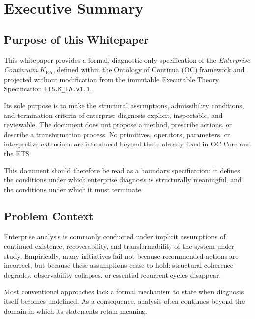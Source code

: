 
\section{Executive Summary}

\subsection*{Purpose of this Whitepaper}

This whitepaper provides a formal, diagnostic-only specification of the
\emph{Enterprise Continuum} $K_{\mathrm{EA}}$, defined within the
Ontology of Continua (OC) framework and projected without modification
from the immutable Executable Theory Specification
\texttt{ETS.K\_EA.v1.1}.

Its sole purpose is to make the structural assumptions, admissibility
conditions, and termination criteria of enterprise diagnosis explicit,
inspectable, and reviewable.
The document does not propose a method, prescribe actions, or describe
a transformation process.
No primitives, operators, parameters, or interpretive extensions are
introduced beyond those already fixed in OC Core and the ETS.

This document should therefore be read as a boundary specification:
it defines the conditions under which enterprise diagnosis is
structurally meaningful, and the conditions under which it must
terminate.

\subsection*{Problem Context}

Enterprise analysis is commonly conducted under implicit assumptions of
continued existence, recoverability, and transformability of the system
under study.
Empirically, many initiatives fail not because recommended actions are
incorrect, but because these assumptions cease to hold: structural
coherence degrades, observability collapses, or essential recurrent
cycles disappear.

Most conventional approaches lack a formal mechanism to state when
diagnosis itself becomes undefined.
As a consequence, analysis often continues beyond the domain in which
its statements retain meaning.


